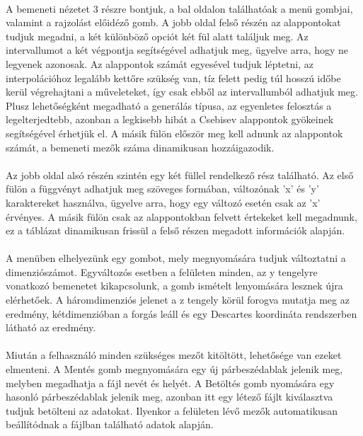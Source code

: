 \documentclass[12pt]{report}
\begin{document}
\paragraph{}
A bemeneti nézetet 3 részre bontjuk, a bal oldalon találhatóak a menü gombjai, valamint a rajzolást előidéző gomb. A jobb oldal felső részén az alappontokat tudjuk megadni, a két különböző opciót két fül alatt találjuk meg. Az intervallumot a két végpontja segítségével adhatjuk meg, ügyelve arra, hogy ne legyenek azonosak. Az alappontok számát egyesével tudjuk léptetni, az interpolációhoz legalább kettőre szükség van, tíz felett pedig túl hosszú időbe kerül végrehajtani a műveleteket, így csak ebből az intervallumból adhatjuk meg. Plusz lehetőségként megadható a generálás típusa, az egyenletes felosztás a legelterjedtebb, azonban a legkisebb hibát a Csebisev alappontok gyökeinek segítségével érhetjük el. A másik fülön először meg kell adnunk az alappontok számát, a bemeneti mezők száma dinamikusan hozzáigazodik.
\paragraph{}
Az jobb oldal alsó részén szintén egy két füllel rendelkező rész található. Az első fülön a függvényt adhatjuk meg szöveges formában, változónak 'x' és 'y' karaktereket használva, ügyelve arra, hogy egy változó esetén csak az 'x' érvényes. A másik fülön csak az alappontokban felvett értekeket kell megadnunk, ez a táblázat dinamikusan frissül a felső részen megadott információk alapján.
\paragraph{}
A menüben elhelyezünk egy gombot, mely megnyomására tudjuk változtatni a dimenziószámot. Egyváltozós esetben a felületen minden, az y tengelyre vonatkozó bemenetet kikapcsolunk, a gomb ismételt lenyomására lesznek újra elérhetőek. A háromdimenziós jelenet a z tengely körül forogva mutatja meg az eredmény, kétdimenzióban a forgás leáll és egy Descartes koordináta rendszerben látható az eredmény.
\paragraph{}
Miután a felhasználó minden szükséges mezőt kitöltött, lehetősége van ezeket elmenteni. A Mentés gomb megnyomására egy új párbeszédablak jelenik meg, melyben megadhatja a fájl nevét és helyét. A Betöltés gomb nyomására egy hasonló párbeszédablak jelenik meg, azonban itt egy létező fájlt kiválasztva tudjuk betölteni az adatokat. Ilyenkor a felületen lévő mezők automatikusan beállítódnak a fájlban található adatok alapján.
\end{document}
